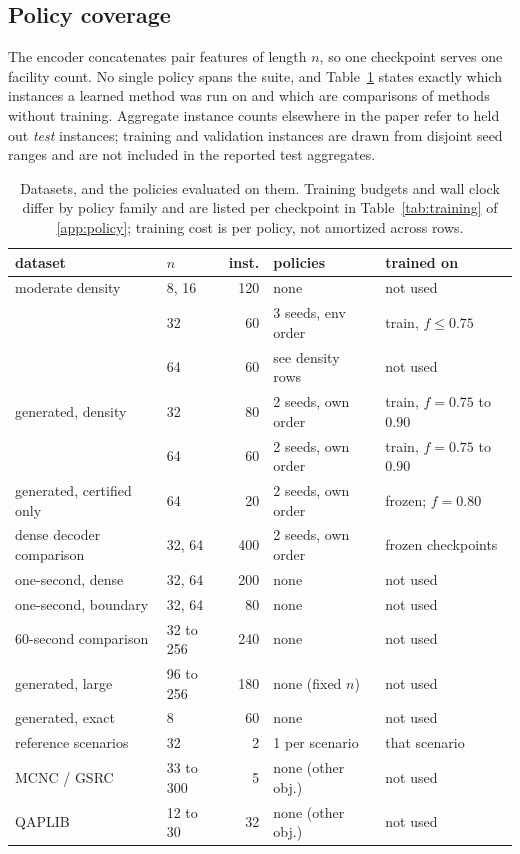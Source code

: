 \documentclass[11pt]{article}
\begin{document}
\subsection{Policy coverage}
\label{sec:coverage_map}
The encoder concatenates pair features of length $n$, so one checkpoint serves one
facility count. No single policy spans the suite,
and Table~\ref{tab:datamap} states exactly which instances a learned method was
run on and which are comparisons of methods without training. Aggregate instance counts
elsewhere in the paper refer to held out \emph{test} instances; training and
validation instances are drawn from disjoint seed ranges and are not included in
the reported test aggregates.

\begin{table}[t]
\centering
\caption{Datasets, and the policies evaluated on them. Training budgets and
wall clock differ by policy family and are listed per checkpoint in
Table~\ref{tab:training} of \ref{app:policy}; training cost is per policy, not
amortized across rows.}
\label{tab:datamap}
\footnotesize
\setlength{\tabcolsep}{3pt}
\begin{tabular}{@{}llrll@{}}
\toprule
dataset & $n$ & inst. & policies & trained on \\
\midrule
moderate density  & 8, 16   & 120 & none               & not used \\
                   & 32      &  60 & 3 seeds, env order & train, $f{\le}0.75$ \\
                   & 64      &  60 & see density rows   & not used \\
generated, density & 32      &  80 & 2 seeds, own order & train, $f{=}0.75$ to $0.90$ \\
                   & 64      &  60 & 2 seeds, own order & train, $f{=}0.75$ to $0.90$ \\
generated, certified only & 64 & 20 & 2 seeds, own order & frozen; $f{=}0.80$ \\
dense decoder comparison & 32, 64 & 400 & 2 seeds, own order & frozen checkpoints \\
one-second, dense & 32, 64 & 200 & none & not used \\
one-second, boundary & 32, 64 & 80 & none & not used \\
60-second comparison & 32 to 256 & 240 & none & not used \\
generated, large   & 96 to 256 & 180 & none (fixed $n$)   & not used \\
generated, exact   & 8       &  60 & none               & not used \\
reference scenarios & 32     &   2 & 1 per scenario     & that scenario \\
MCNC / GSRC        & 33 to 300 &   5 & none (other obj.)  & not used \\
QAPLIB             & 12 to 30  &  32 & none (other obj.)  & not used \\
\bottomrule
\end{tabular}
\end{table}
\end{document}
